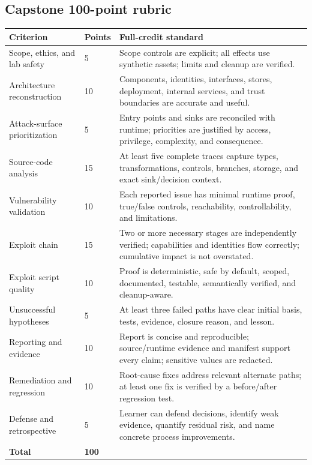 \documentclass[11pt]{article}
\begin{document}
\subsection{Capstone 100-point rubric}
\begin{longtable}{@{}L{0.30\textwidth}L{0.08\textwidth}L{0.49\textwidth}@{}}
\toprule
\textbf{Criterion} & \textbf{Points} & \textbf{Full-credit standard} \\
\midrule
\endhead
Scope, ethics, and lab safety & 5 & Scope controls are explicit; all effects use synthetic assets; limits and cleanup are verified. \\
Architecture reconstruction & 10 & Components, identities, interfaces, stores, deployment, internal services, and trust boundaries are accurate and useful. \\
Attack-surface prioritization & 5 & Entry points and sinks are reconciled with runtime; priorities are justified by access, privilege, complexity, and consequence. \\
Source-code analysis & 15 & At least five complete traces capture types, transformations, controls, branches, storage, and exact sink/decision context. \\
Vulnerability validation & 10 & Each reported issue has minimal runtime proof, true/false controls, reachability, controllability, and limitations. \\
Exploit chain & 15 & Two or more necessary stages are independently verified; capabilities and identities flow correctly; cumulative impact is not overstated. \\
Exploit script quality & 10 & Proof is deterministic, safe by default, scoped, documented, testable, semantically verified, and cleanup-aware. \\
Unsuccessful hypotheses & 5 & At least three failed paths have clear initial basis, tests, evidence, closure reason, and lesson. \\
Reporting and evidence & 10 & Report is concise and reproducible; source/runtime evidence and manifest support every claim; sensitive values are redacted. \\
Remediation and regression & 10 & Root-cause fixes address relevant alternate paths; at least one fix is verified by a before/after regression test. \\
Defense and retrospective & 5 & Learner can defend decisions, identify weak evidence, quantify residual risk, and name concrete process improvements. \\
\midrule
\textbf{Total} & \textbf{100} & \\
\bottomrule
\end{longtable}
\end{document}
